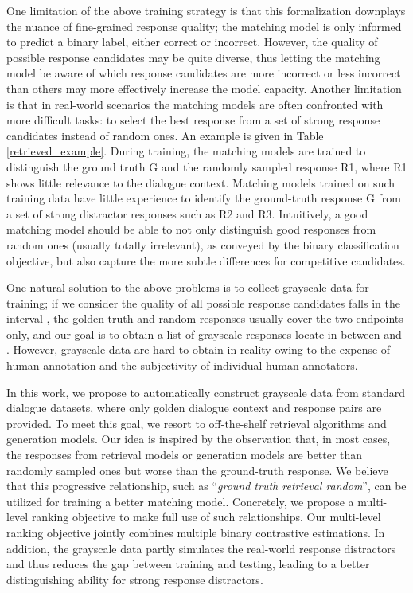 \documentclass[11pt,a4paper]{article}
\begin{document}
	One limitation of the above training strategy is that this formalization downplays the nuance of fine-grained response quality; the matching model is only informed to predict a binary label, either correct or incorrect. However, the quality of possible response candidates may be quite diverse, thus letting the matching model be aware of which response candidates are more incorrect or less incorrect than others may more effectively increase the model capacity. Another limitation is that in real-world scenarios the matching models are often confronted with more difficult tasks: to select the best response from a set of strong response candidates instead of random ones. An example is given in Table \ref{retrieved_example}. During training, the matching models are trained to distinguish the ground truth G and the randomly sampled response R1, where R1 shows little relevance to the dialogue context. Matching models trained on such training data have little experience to identify the ground-truth response G from a set of strong distractor responses such as R2 and R3. Intuitively, a good matching model should be able to not only distinguish good responses from random ones (usually totally irrelevant), as conveyed by the binary classification objective, but also capture the more subtle differences for competitive candidates.
	
	One natural solution to the above problems is to collect grayscale data for training; if we consider the quality of all possible response candidates falls in the interval , the golden-truth and random responses usually cover the two endpoints only, and our goal is to obtain a list of grayscale responses locate in between  and . However, grayscale data are hard to obtain in reality owing to the expense of human annotation and the subjectivity of individual human annotators.
	
	In this work, we propose to automatically construct grayscale data from standard dialogue datasets, where only golden dialogue context and response pairs are provided. To meet this goal, we resort to off-the-shelf retrieval algorithms and generation models. Our idea is inspired by the observation that, in most cases, the responses from retrieval models or generation models are better than randomly sampled ones but worse than the ground-truth response. We believe that this progressive relationship, such as ``\textit{ground truth  retrieval  random}'', can be utilized for training a better matching model. Concretely, we propose a multi-level ranking objective to make full use of such relationships. Our multi-level ranking objective jointly combines multiple binary contrastive estimations. In addition, the grayscale data partly simulates the real-world response distractors and thus reduces the gap between training and testing, leading to a better distinguishing ability for strong response distractors. 
	
\end{document}
